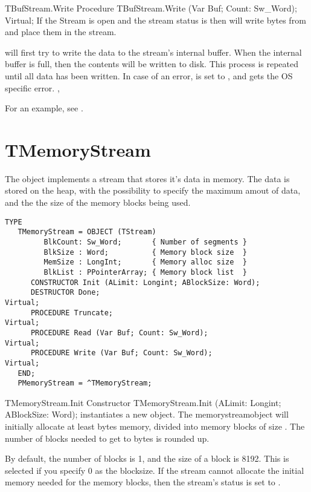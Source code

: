 \begin{procedure}{TBufStream.Write}
\Declaration
Procedure TBufStream.Write (Var Buf; Count: Sw\_Word); Virtual;
\Description
If the Stream is open and the stream status is  then 
 will write  bytes from  and place them
in the stream.

 will first try to write the data to the stream's internal
buffer. When the internal buffer is full, then the contents will be written 
to disk. This process is repeated until all data has been written.
\Errors
In case of an error,  is set to , and
 gets the OS specific error.
\SeeAlso
{}, 
\end{procedure}

For an example, see .

\section{TMemoryStream}
\label{se:TMemoryStream}

The  object implements a stream that stores it's data
in memory. The data is stored on the heap, with the possibility to specify
the maximum amout of data, and the the size of the memory blocks being used.
 
\begin{verbatim}
TYPE
   TMemoryStream = OBJECT (TStream)
         BlkCount: Sw_Word;       { Number of segments }
         BlkSize : Word;          { Memory block size  }
         MemSize : LongInt;       { Memory alloc size  }
         BlkList : PPointerArray; { Memory block list  }
      CONSTRUCTOR Init (ALimit: Longint; ABlockSize: Word);
      DESTRUCTOR Done;                                               Virtual;
      PROCEDURE Truncate;                                            Virtual;
      PROCEDURE Read (Var Buf; Count: Sw_Word);                      Virtual;
      PROCEDURE Write (Var Buf; Count: Sw_Word);                     Virtual;
   END;
   PMemoryStream = ^TMemoryStream;
\end{verbatim}

\begin{procedure}{TMemoryStream.Init}
\Declaration
Constructor TMemoryStream.Init (ALimit: Longint; ABlockSize: Word);
\Description
{} instantiates a new  object. The
memorystreamobject will initially allocate at least  bytes memory, 
divided into memory blocks of size . 
The number of blocks needed to get to  bytes is rounded up.

By default, the number of blocks is 1, and the size of a block is 8192. This
is selected if you specify 0 as the blocksize.
\Errors
If the stream cannot allocate the initial memory needed for the memory blocks, then
the stream's status is set to .
\SeeAlso
{}
\end{procedure}

